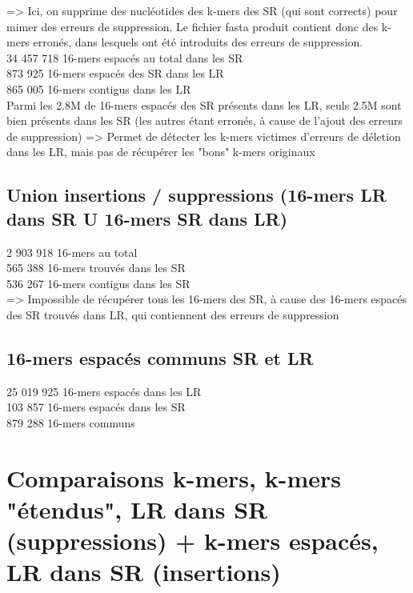 \documentclass[12pt]{article}
\begin{document}
=> Ici, on supprime des nucléotides des k-mers des SR (qui sont corrects) pour mimer des erreurs de suppression.
Le fichier fasta produit contient donc des k-mers erronés, dans lesquels ont été introduits des erreurs de suppression. \\

34 457 718 16-mers espacés au total dans les SR \\
 873 925 16-mers espacés des SR dans les LR \\
 865 005 16-mers contigus dans les LR \\

Parmi les 2.8M de 16-mers espacés des SR présents dans les LR, seuls 2.5M sont bien présents dans les SR (les autres étant erronés, à cause
de l'ajout des erreurs de suppression) => Permet de détecter les k-mers victimes d'erreurs de déletion dans les LR, mais pas de récupérer les "bons"
k-mers originaux

\subsection{Union insertions / suppressions (16-mers LR dans SR U 16-mers SR dans LR)}

2 903 918 16-mers au total \\
 565 388 16-mers trouvés dans les SR \\
 536 267 16-mers contigus dans les SR \\

=> Impossible de récupérer tous les 16-mers des SR, à cause des 16-mers espacés des SR trouvés dans LR,
qui contiennent des erreurs de suppression

\subsection{16-mers espacés communs SR et LR}

25 019 925 16-mers espacés dans les LR \\
 103 857 16-mers espacés dans les SR \\
 879 288 16-mers communs \\

\section{Comparaisons k-mers, k-mers "étendus", LR dans SR (suppressions) + k-mers espacés, LR dans SR (insertions)}
\end{document}
